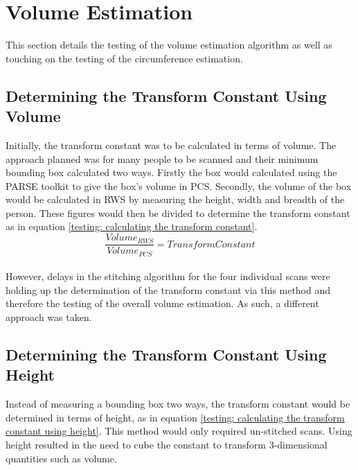 \section{Volume Estimation}
\label{volume estimation}
\label{testing:vol est} %
This section details the testing of the volume estimation algorithm as well as touching on the testing of the circumference estimation.

\subsection{Determining the Transform Constant Using Volume}
\label{determining the transform constant}
Initially, the transform constant was to be calculated in terms of volume. The approach planned was for many people to be scanned and their minimum bounding box calculated two ways. Firstly the box would calculated using the PARSE toolkit to give the box's volume in PCS. Secondly, the volume of the box would be calculated in RWS by measuring the height, width and breadth of the person. These figures would then be divided to determine the transform constant as in equation \ref{testing: calculating the transform constant}.\\

\begin{equation}
\frac{Volume_{RWS}}{Volume_{PCS}} = Transform Constant
\label{testing: calculating the transform constant}
\end{equation}\\

However, delays in the stitching algorithm for the four individual scans were holding up the determination of the transform constant via this method and therefore the testing of the overall volume estimation. As such, a different approach was taken. 

\subsection{Determining the Transform Constant Using Height}
\label{determining the transform constant using height}
Instead of measuring a bounding box two ways, the transform constant would be determined in terms of height, as in equation \ref{testing: calculating the transform constant using height}. This method would only required un-stitched scans. Using height resulted in the need to cube the constant to transform 3-dimensional quantities such as volume.\\


